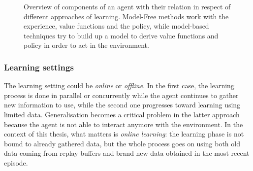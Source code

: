 \begin{figure}
	\centering
	\caption[Overview of different components in reinforcement learning]{ Overview of components of an agent with their relation in respect of different approaches of learning.
		Model-Free methods work with the experience, value functions and the policy, while model-based techniques try to build up a model to derive value functions and policy in order to act in the environment.}
	\label{fig:components}
\end{figure}

\subsubsection{Learning settings}

The learning setting could be \textit{online} or \textit{offline}.
In the first case, the learning process is done in parallel or concurrently while the agent continues to gather new information to use, while the second one progresses toward learning using limited data.
Generalisation becomes a critical problem in the latter approach because the agent is not able to interact anymore with the environment.
In the context of this thesis, what matters is \textit{online learning}: the learning phase is not bound to already gathered data, but the whole process goes on using both old data coming from replay buffers and brand new data obtained in the most recent episode.

